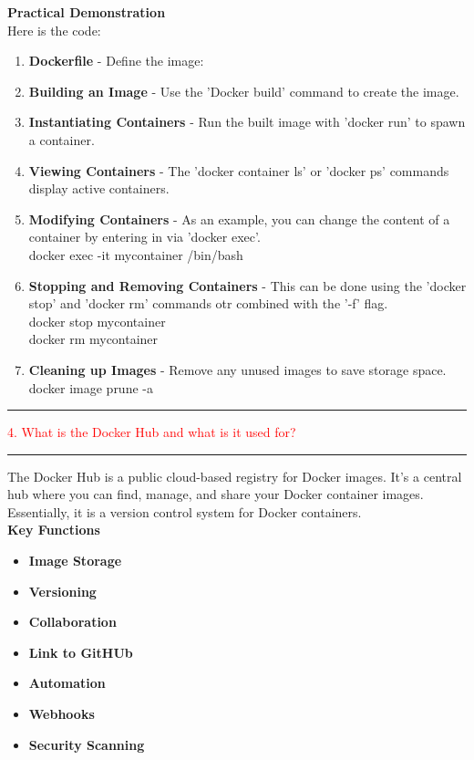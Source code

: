 \documentclass{article}
\begin{document}
\textbf{Practical Demonstration} \\
Here is the code:
\begin{enumerate}
    \item \textbf{Dockerfile} - Define the image:
    \item \textbf{Building an Image} - Use the 'Docker build' command to create the image.
    \item \textbf{Instantiating Containers} - Run the built image with 'docker run' to spawn a container.
    \item \textbf{Viewing Containers} - The 'docker container ls' or 'docker ps' commands display active containers.
    \item \textbf{Modifying Containers} - As an example, you can change the content of a container by entering in via 'docker exec'. \\
    docker exec -it mycontainer /bin/bash
    \item \textbf{Stopping and Removing Containers} - This can be done using the 'docker stop' and 'docker rm' commands otr combined with the '-f' flag. \\
    docker stop mycontainer \\
    docker rm mycontainer 
    \item \textbf{Cleaning up Images} - Remove any unused images to save storage space. \\
    docker image prune -a
\end{enumerate}


\noindent
{\color{red} \rule{\linewidth}{0.5mm}}
\textcolor{red}{4. What is the Docker Hub and what is it used for?} \\
\noindent
{\color{red} \rule{\linewidth}{0.5mm}}
The Docker Hub is a public cloud-based registry for Docker images. It's a central hub where you can find, manage, and share your Docker container images. Essentially, it is a version control system for Docker containers. \\
\textbf{Key Functions}
\begin{itemize}
    \item \textbf{Image Storage}
    \item \textbf{Versioning}
    \item \textbf{Collaboration}
    \item \textbf{Link to GitHUb}
    \item \textbf{Automation}
    \item \textbf{Webhooks}
    \item \textbf{Security Scanning}
\end{itemize}
\end{document}

